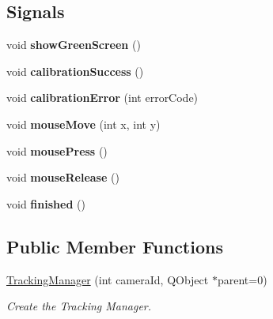 \subsection*{Signals}
\begin{DoxyCompactItemize}
\item 
\hypertarget{classTrackingManager_ad4f94efc3dd5b3b0a3d42e3adb4510e7}{}void {\bfseries show\+Green\+Screen} ()\label{classTrackingManager_ad4f94efc3dd5b3b0a3d42e3adb4510e7}

\item 
\hypertarget{classTrackingManager_adeff149404d6a11e0e601dce2c6fbf19}{}void {\bfseries calibration\+Success} ()\label{classTrackingManager_adeff149404d6a11e0e601dce2c6fbf19}

\item 
\hypertarget{classTrackingManager_a27991c87468af9ea491d8d03500cba7d}{}void {\bfseries calibration\+Error} (int error\+Code)\label{classTrackingManager_a27991c87468af9ea491d8d03500cba7d}

\item 
\hypertarget{classTrackingManager_af855534686754a9a8faf8bb3ab3c025d}{}void {\bfseries mouse\+Move} (int x, int y)\label{classTrackingManager_af855534686754a9a8faf8bb3ab3c025d}

\item 
\hypertarget{classTrackingManager_a6ead6e5bfb2771828999ef6a422fc9ae}{}void {\bfseries mouse\+Press} ()\label{classTrackingManager_a6ead6e5bfb2771828999ef6a422fc9ae}

\item 
\hypertarget{classTrackingManager_abacc04eccec18a93d6b608c58836cca6}{}void {\bfseries mouse\+Release} ()\label{classTrackingManager_abacc04eccec18a93d6b608c58836cca6}

\item 
\hypertarget{classTrackingManager_a4656804e577a454304ec6130498de15e}{}void {\bfseries finished} ()\label{classTrackingManager_a4656804e577a454304ec6130498de15e}

\end{DoxyCompactItemize}
\subsection*{Public Member Functions}
\begin{DoxyCompactItemize}
\item 
\hyperlink{classTrackingManager_a4eaf01c120866ec67137abd9fcaf51e2}{Tracking\+Manager} (int camera\+Id, Q\+Object $\ast$parent=0)
\begin{DoxyCompactList}\small\item\em Create the Tracking Manager. \end{DoxyCompactList}\end{DoxyCompactItemize}


